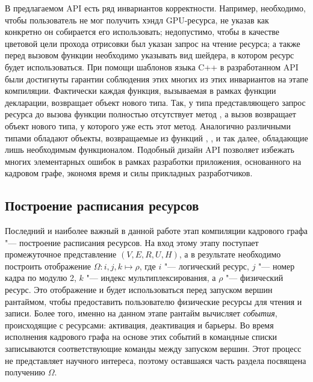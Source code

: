 В предлагаемом API есть ряд инвариантов корректности.
Например, необходимо, чтобы пользователь не мог получить хэндл GPU-ресурса, не указав как конкретно он собирается его использовать; недопустимо, чтобы в качестве цветовой цели прохода отрисовки был указан запрос на чтение ресурса; а также перед вызовом функции  необходимо указывать вид шейдера, в котором ресурс будет использоваться.
При помощи шаблонов языка C++ в разработанном API были достигнуты гарантии соблюдения этих многих из этих инвариантов на этапе компиляции.
Фактически каждая функция, вызываемая в рамках функции декларации, возвращает объект нового типа.
Так, у типа представляющего запрос ресурса до вызова функции  полностью отсутствует метод , а вызов  возвращает объект нового типа, у которого уже есть этот метод.
Аналогично различными типами обладают объекты, возвращаемые из функций , ,  и так далее, обладающие лишь необходимым функционалом.
Подобный дизайн API позволяет избежать многих элементарных ошибок в рамках разработки приложения, основанного на кадровом графе, экономя время и силы прикладных разработчиков.

\subsection{Построение расписания ресурсов}
Последний и наиболее важный в данной работе этап компиляции кадрового графа "--- построение расписания ресурсов.
На вход этому этапу поступает промежуточное представление $(V, E, R, U, H)$, а в результате необходимо построить отображение $\Omega : i, j, k \mapsto \rho$, где $i$ "--- логический ресурс, $j$ "--- номер кадра по модулю 2, $k$ "--- индекс мультиплексирования, а $\rho$ "--- физический ресурс.
Это отображение и будет использоваться перед запуском вершин рантаймом, чтобы предоставить пользователю физические ресурсы для чтения и записи.
Более того, именно на данном этапе рантайм вычисляет \textit{события}, происходящие с ресурсами: активация, деактивация и барьеры.
Во время исполнения кадрового графа на основе этих событий в командные списки записываются соответствующие команды между запуском вершин.
Этот процесс не представляет научного интереса, поэтому оставшаяся часть раздела посвящена получению $\Omega$.

